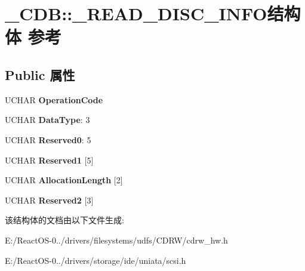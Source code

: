\hypertarget{struct___c_d_b_1_1___r_e_a_d___d_i_s_c___i_n_f_o}{}\section{\+\_\+\+C\+DB\+:\+:\+\_\+\+R\+E\+A\+D\+\_\+\+D\+I\+S\+C\+\_\+\+I\+N\+F\+O结构体 参考}
\label{struct___c_d_b_1_1___r_e_a_d___d_i_s_c___i_n_f_o}
\subsection*{Public 属性}
\begin{DoxyCompactItemize}
\item 
\mbox{\label{struct___c_d_b_1_1___r_e_a_d___d_i_s_c___i_n_f_o_af9b82a87251ac47eea9fdb361c28ff49}} 
U\+C\+H\+AR {\bfseries Operation\+Code}
\item 
\mbox{\label{struct___c_d_b_1_1___r_e_a_d___d_i_s_c___i_n_f_o_ae4a9a6ab65ae71747fc7d995d0e25d47}} 
U\+C\+H\+AR {\bfseries Data\+Type}\+: 3
\item 
\mbox{\label{struct___c_d_b_1_1___r_e_a_d___d_i_s_c___i_n_f_o_a04f8d55f2386874c429dc156da78f5f8}} 
U\+C\+H\+AR {\bfseries Reserved0}\+: 5
\item 
\mbox{\label{struct___c_d_b_1_1___r_e_a_d___d_i_s_c___i_n_f_o_a28e873a77b4af90974661bfa98a427bc}} 
U\+C\+H\+AR {\bfseries Reserved1} \mbox{[}5\mbox{]}
\item 
\mbox{\label{struct___c_d_b_1_1___r_e_a_d___d_i_s_c___i_n_f_o_a97ad7b82102d5b8f31856e18a14b15a9}} 
U\+C\+H\+AR {\bfseries Allocation\+Length} \mbox{[}2\mbox{]}
\item 
\mbox{\label{struct___c_d_b_1_1___r_e_a_d___d_i_s_c___i_n_f_o_a8f6091e52909e754ff1bc84a8f3b4de6}} 
U\+C\+H\+AR {\bfseries Reserved2} \mbox{[}3\mbox{]}
\end{DoxyCompactItemize}


该结构体的文档由以下文件生成\+:\begin{DoxyCompactItemize}
\item 
E\+:/\+React\+O\+S-\/0../drivers/filesystems/udfs/\+C\+D\+R\+W/cdrw\+\_\+hw.\+h\item 
E\+:/\+React\+O\+S-\/0../drivers/storage/ide/uniata/scsi.\+h\end{DoxyCompactItemize}
